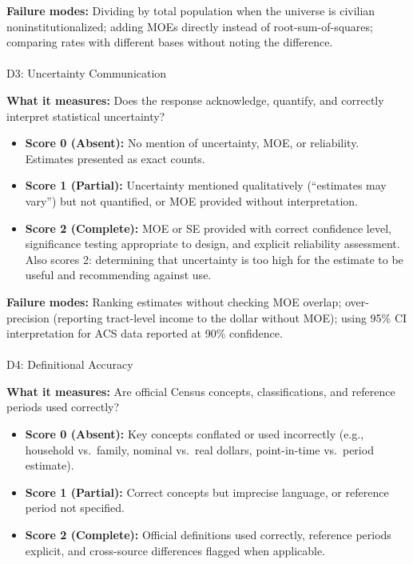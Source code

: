 \documentclass[
  11pt,
  letterpaper,
]{article}
\makeatletter
\let\oldparagraph\paragraph
\renewcommand{\paragraph}{
    \@ifstar
      \xxxParagraphStar
      \xxxParagraphNoStar
  }
\newcommand{\xxxParagraphStar}[1]{\oldparagraph*{#1}\mbox{}}
\newcommand{\xxxParagraphNoStar}[1]{\oldparagraph{#1}\mbox{}}
\providecommand{\tightlist}{%
  \setlength{\itemsep}{0pt}\setlength{\parskip}{0pt}}
\makeatother
\begin{document}
\textbf{Failure modes:} Dividing by total population when the universe
is civilian noninstitutionalized; adding MOEs directly instead of
root-sum-of-squares; comparing rates with different bases without noting
the difference.

\paragraph{D3: Uncertainty
Communication}\label{d3-uncertainty-communication}

\textbf{What it measures:} Does the response acknowledge, quantify, and
correctly interpret statistical uncertainty?

\begin{itemize}
\tightlist
\item
  \textbf{Score 0 (Absent):} No mention of uncertainty, MOE, or
  reliability. Estimates presented as exact counts.
\item
  \textbf{Score 1 (Partial):} Uncertainty mentioned qualitatively
  (``estimates may vary'') but not quantified, or MOE provided without
  interpretation.
\item
  \textbf{Score 2 (Complete):} MOE or SE provided with correct
  confidence level, significance testing appropriate to design, and
  explicit reliability assessment. Also scores 2: determining that
  uncertainty is too high for the estimate to be useful and recommending
  against use.
\end{itemize}

\textbf{Failure modes:} Ranking estimates without checking MOE overlap;
over-precision (reporting tract-level income to the dollar without MOE);
using 95\% CI interpretation for ACS data reported at 90\% confidence.

\paragraph{D4: Definitional Accuracy}\label{d4-definitional-accuracy}

\textbf{What it measures:} Are official Census concepts,
classifications, and reference periods used correctly?

\begin{itemize}
\tightlist
\item
  \textbf{Score 0 (Absent):} Key concepts conflated or used incorrectly
  (e.g., household vs.~family, nominal vs.~real dollars, point-in-time
  vs.~period estimate).
\item
  \textbf{Score 1 (Partial):} Correct concepts but imprecise language,
  or reference period not specified.
\item
  \textbf{Score 2 (Complete):} Official definitions used correctly,
  reference periods explicit, and cross-source differences flagged when
  applicable.
\end{itemize}
\end{document}
